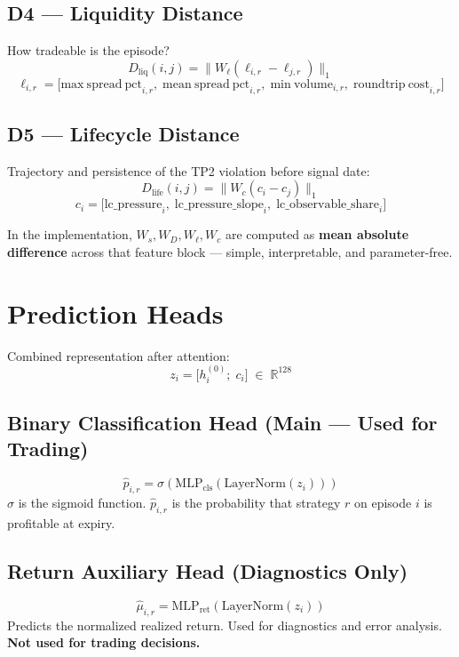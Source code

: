 \documentclass[11pt]{article}
\newcommand{\R}{\mathbb{R}}
\newcommand{\1}{\mathbf{1}}
\begin{document}
\subsection{D4 --- Liquidity Distance}
How tradeable is the episode?
\[
  D_{\mathrm{liq}}(i,j)
  =
  \bigl\|W_\ell(\ell_{i,r} - \ell_{j,r})\bigr\|_1
\]
\[
  \ell_{i,r}
  =
  \bigl[
    \mathrm{max\ spread\ pct}_{i,r},\;
    \mathrm{mean\ spread\ pct}_{i,r},\;
    \mathrm{min\ volume}_{i,r},\;
    \mathrm{roundtrip\ cost}_{i,r}
  \bigr]
\]

\subsection{D5 --- Lifecycle Distance}
Trajectory and persistence of the TP2 violation before signal date:
\[
  D_{\mathrm{life}}(i,j)
  =
  \bigl\|W_c(c_i - c_j)\bigr\|_1
\]
\[
  c_i
  =
  \bigl[
    \mathrm{lc\_pressure}_i,\;
    \mathrm{lc\_pressure\_slope}_i,\;
    \mathrm{lc\_observable\_share}_i
  \bigr]
\]

In the implementation, $W_s, W_D, W_\ell, W_c$ are computed as
\textbf{mean absolute difference} across that feature block --- simple,
interpretable, and parameter-free.

\section{Prediction Heads}

Combined representation after attention:
\[
  z_i = \bigl[h_i^{(0)};\; c_i\bigr] \;\in\; \R^{128}
\]

\subsection{Binary Classification Head (Main --- Used for Trading)}
\[
  \hat{p}_{i,r}
  =
  \sigma\!\left(
    \mathrm{MLP}_{\mathrm{cls}}\!\left(
      \mathrm{LayerNorm}(z_i)
    \right)
  \right)
\]
$\sigma$ is the sigmoid function. $\hat{p}_{i,r}$ is the probability that
strategy $r$ on episode $i$ is profitable at expiry.

\subsection{Return Auxiliary Head (Diagnostics Only)}
\[
  \hat{\mu}_{i,r}
  =
  \mathrm{MLP}_{\mathrm{ret}}\!\left(
    \mathrm{LayerNorm}(z_i)
  \right)
\]
Predicts the normalized realized return. Used for diagnostics and error
analysis. \textbf{Not used for trading decisions.}
\end{document}
